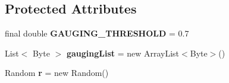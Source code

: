 \subsection*{Protected Attributes}
\begin{DoxyCompactItemize}
\item 
\hypertarget{classitc_1_1_c_tactic_a2d99e5b6935acf7476934fac845716d6}{
final double {\bfseries GAUGING\_\-THRESHOLD} = 0.7}
\label{classitc_1_1_c_tactic_a2d99e5b6935acf7476934fac845716d6}

\item 
\hypertarget{classitc_1_1_c_tactic_a1b6717d9d6b74ce9f1d3f8e8fb18adca}{
List$<$ Byte $>$ {\bfseries gaugingList} = new ArrayList$<$Byte$>$()}
\label{classitc_1_1_c_tactic_a1b6717d9d6b74ce9f1d3f8e8fb18adca}

\item 
\hypertarget{classitc_1_1_c_tactic_a1b977fc5aa7714e83dd93c04461c5770}{
Random {\bfseries r} = new Random()}
\label{classitc_1_1_c_tactic_a1b977fc5aa7714e83dd93c04461c5770}

\end{DoxyCompactItemize}


